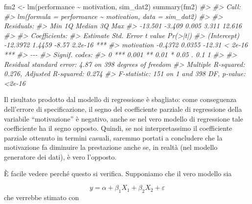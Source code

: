 \documentclass[
  11pt,
]{krantz}
\makeatletter
\newenvironment{Shaded}{\begin{snugshade}}{\end{snugshade}}
\newcommand{\CommentTok}[1]{\textcolor[rgb]{0.37,0.37,0.37}{\textit{#1}}}
\newcommand{\FunctionTok}[1]{\textcolor[rgb]{0,0,0}{#1}}
\newcommand{\NormalTok}[1]{#1}
\newcommand{\OtherTok}[1]{\textcolor[rgb]{0.37,0.37,0.37}{#1}}
\newcommand{\SpecialCharTok}[1]{\textcolor[rgb]{0,0,0}{#1}}
\newenvironment{kframe}{%
\medskip{}
\setlength{\fboxsep}{.8em}
 \def\at@end@of@kframe{}%
 \ifinner\ifhmode%
  \def\at@end@of@kframe{\end{minipage}}%
  \begin{minipage}{\columnwidth}%
 \fi\fi%
 \def\FrameCommand##1{\hskip\@totalleftmargin \hskip-\fboxsep
 \colorbox{shadecolor}{##1}\hskip-\fboxsep
     \hskip-\linewidth \hskip-\@totalleftmargin \hskip\columnwidth}%
 \MakeFramed {\advance\hsize-\width
   \@totalleftmargin\z@ \linewidth\hsize
   \@setminipage}}%
 {\par\unskip\endMakeFramed%
 \at@end@of@kframe}
\renewenvironment{Shaded}{\begin{kframe}}{\end{kframe}}
\theoremstyle{definition}
\theoremstyle{definition}
\theoremstyle{definition}
\theoremstyle{definition}
\theoremstyle{remark}
\makeatother
\begin{document}
\begin{Shaded}
\begin{Highlighting}[]
\NormalTok{fm2 }\OtherTok{\textless{}{-}} \FunctionTok{lm}\NormalTok{(performance }\SpecialCharTok{\textasciitilde{}}\NormalTok{ motivation, sim\_dat2)}
\FunctionTok{summary}\NormalTok{(fm2)}
\CommentTok{\#\textgreater{} }
\CommentTok{\#\textgreater{} Call:}
\CommentTok{\#\textgreater{} lm(formula = performance \textasciitilde{} motivation, data = sim\_dat2)}
\CommentTok{\#\textgreater{} }
\CommentTok{\#\textgreater{} Residuals:}
\CommentTok{\#\textgreater{}     Min      1Q  Median      3Q     Max }
\CommentTok{\#\textgreater{} {-}13.501  {-}3.409   0.005   3.311  12.616 }
\CommentTok{\#\textgreater{} }
\CommentTok{\#\textgreater{} Coefficients:}
\CommentTok{\#\textgreater{}             Estimate Std. Error t value Pr(\textgreater{}|t|)    }
\CommentTok{\#\textgreater{} (Intercept) {-}12.3972     1.4459   {-}8.57  2.2e{-}16 ***}
\CommentTok{\#\textgreater{} motivation   {-}0.4372     0.0355  {-}12.31  \textless{} 2e{-}16 ***}
\CommentTok{\#\textgreater{} {-}{-}{-}}
\CommentTok{\#\textgreater{} Signif. codes:  }
\CommentTok{\#\textgreater{} 0 \textquotesingle{}***\textquotesingle{} 0.001 \textquotesingle{}**\textquotesingle{} 0.01 \textquotesingle{}*\textquotesingle{} 0.05 \textquotesingle{}.\textquotesingle{} 0.1 \textquotesingle{} \textquotesingle{} 1}
\CommentTok{\#\textgreater{} }
\CommentTok{\#\textgreater{} Residual standard error: 4.87 on 398 degrees of freedom}
\CommentTok{\#\textgreater{} Multiple R{-}squared:  0.276,  Adjusted R{-}squared:  0.274 }
\CommentTok{\#\textgreater{} F{-}statistic:  151 on 1 and 398 DF,  p{-}value: \textless{}2e{-}16}
\end{Highlighting}
\end{Shaded}

Il risultato prodotto dal modello di regressione è sbagliato: come conseguenza dell'errore di specificazione, il segno del coefficiente parziale di regressione della variabile ``motivazione'' è negativo, anche se nel vero modello di regressione tale coefficiente ha il segno opposto. Quindi, se noi interpretassimo il coefficiente parziale ottenuto in termini casuali, saremmo portati a concludere che la motivazione fa diminuire la prestazione anche se, in realtà (nel modello generatore dei dati), è vero l'opposto.

È facile vedere perché questo si verifica. Supponiamo che il vero modello sia

\[
y = \alpha + \beta_1 X_1 + \beta_2 X_2 + \varepsilon
\] che verrebbe stimato con
\end{document}
